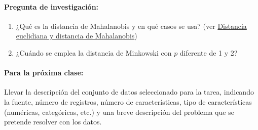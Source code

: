 \documentclass[a4,11pt]{aleph-notas}
\begin{document}
\paragraph{Pregunta de investigación:}
\begin{enumerate}[leftmargin=*]
    \item ¿Qué es la distancia de Mahalanobis y en qué casos se usa? (ver \href{https://youtu.be/xXhLvheEF7o?si=d9utsZOrSU1cCGyv}{Distancia euclidiana y distancia de Mahalanobis})
    \item ¿Cuándo se emplea la distancia de Minkowski con $p$ diferente de 1 y 2?
\end{enumerate}

\paragraph{Para la próxima clase:}
    Llevar la descripción del conjunto de datos seleccionado para la tarea, indicando la fuente, número de registros, número de características, tipo de características (numéricas, categóricas, etc.) y una breve descripción del problema que se pretende resolver con los datos.
\end{document}
